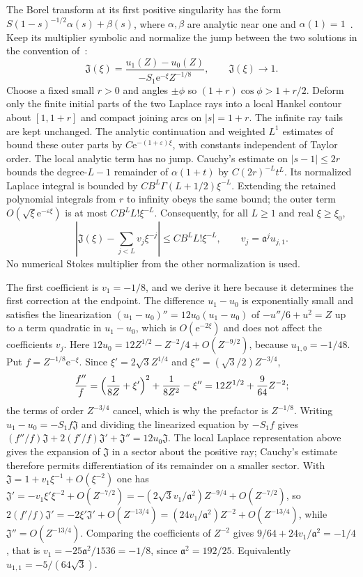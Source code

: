 The Borel transform at its first positive singularity has the form
$S(1-s)^{-1/2}\alpha(s)+\beta(s)$, where $\alpha,\beta$ are analytic
near one and $\alpha(1)=1$~\cite[Proposition~3(i)]{CCH}. Keep its multiplier symbolic
and normalize the jump between the two solutions in the convention of~\cite{GIKM}:
\[
 \mathfrak J(\xi)=
 \frac{u_1(Z)-u_0(Z)}{-S_1\mathrm{e}^{-\xi}Z^{-1/8}},\qquad
 \mathfrak J(\xi)\longrightarrow1.
\]
Choose a fixed small $r>0$ and angles $\pm\phi$ so
$(1+r)\cos\phi>1+r/2$. Deform only the finite initial parts of the
two Laplace rays into a local Hankel contour about $[1,1+r]$ and
compact joining arcs on $|s|=1+r$. The infinite ray tails are kept
unchanged. The analytic continuation and weighted $L^1$ estimates
of~\cite[Lemma~17(c),(f)]{CCH} bound these outer parts by $C\mathrm{e}^{-(1+\varepsilon)\xi}$,
with constants independent of Taylor order.
The local analytic term has no jump. Cauchy's estimate on $|s-1|\le2r$
bounds the degree-$L-1$ remainder of $\alpha(1+t)$ by
$C(2r)^{-L}t^L$. Its normalized Laplace integral is bounded by
$CB^L\Gamma(L+1/2)\xi^{-L}$. Extending the retained polynomial
integrals from $r$ to infinity obeys the same bound; the outer term
$O(\sqrt\xi \mathrm{e}^{-\varepsilon\xi})$ is at most $CB^LL!\xi^{-L}$.
Consequently, for all $L\ge1$ and real $\xi\ge\xi_0$,
\[
 \left|\mathfrak J(\xi)-\sum_{j<L}v_j\xi^{-j}\right|
       \le CB^LL!\xi^{-L},\qquad v_j=\mathfrak a^ju_{j,1}.
\]
No numerical Stokes multiplier from the other normalization is used.

The first coefficient is $v_1=-1/8$, and we derive it here because it
determines the first correction at the endpoint. The difference
$u_1-u_0$ is exponentially small and satisfies the linearization
$(u_1-u_0)''=12u_0(u_1-u_0)$ of $-u''/6+u^2=Z$ up to a term quadratic in
$u_1-u_0$, which is $O(\mathrm{e}^{-2\xi})$ and does not affect the
coefficients $v_j$. Here $12u_0=12Z^{1/2}-Z^{-2}/4+O(Z^{-9/2})$, because
$u_{1,0}=-1/48$. Put $f=Z^{-1/8}\mathrm{e}^{-\xi}$. Since
$\xi'=2\sqrt3Z^{1/4}$ and $\xi''=(\sqrt3/2)Z^{-3/4}$,
\[
 \frac{f''}f=\Bigl(\frac1{8Z}+\xi'\Bigr)^2+\frac1{8Z^2}-\xi''
 =12Z^{1/2}+\frac9{64}Z^{-2};
\]
the terms of order $Z^{-3/4}$ cancel, which is why the prefactor is
$Z^{-1/8}$. Writing $u_1-u_0=-S_1f\mathfrak J$ and dividing the
linearized equation by $-S_1f$ gives
$(f''/f)\mathfrak J+2(f'/f)\mathfrak J'+\mathfrak J''=12u_0\mathfrak J$.
The local Laplace representation above gives the expansion of
$\mathfrak J$ in a sector about the positive ray; Cauchy's estimate
therefore permits differentiation of its remainder on a smaller sector.
With $\mathfrak J=1+v_1\xi^{-1}+O(\xi^{-2})$ one has
$\mathfrak J'=-v_1\xi'\xi^{-2}+O(Z^{-7/2})=-(2\sqrt3v_1/\mathfrak a^2)Z^{-9/4}+O(Z^{-7/2})$,
so $2(f'/f)\mathfrak J'=-2\xi'\mathfrak J'+O(Z^{-13/4})=(24v_1/\mathfrak a^2)Z^{-2}+O(Z^{-13/4})$,
while $\mathfrak J''=O(Z^{-13/4})$. Comparing the coefficients of
$Z^{-2}$ gives $9/64+24v_1/\mathfrak a^2=-1/4$, that is
$v_1=-25\mathfrak a^2/1536=-1/8$, since $\mathfrak a^2=192/25$.
Equivalently $u_{1,1}=-5/(64\sqrt3)$.

